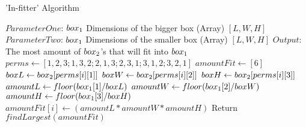 \documentclass{article}
\begin{document}
	
	\begin{algorithm}
		\caption{'In-fitter' Algorithm }
		\label{array-sum}
		\begin{algorithmic}[1]
			\State $ParameterOne$: $box\textsubscript{1}$ Dimensions of the bigger box (Array) $[L, W, H]$
			\State $ParameterTwo$: $box\textsubscript{1}$ Dimensions of the smaller box (Array) $[L, W, H]$
			\State $Output$: The most amount of $box\textsubscript{2}$'s that will fit into $box\textsubscript{1}$
			\State
			\State $perms \leftarrow [1,2,3;1,3,2;2,1,3;2,3,1;3,1,2;3,2,1]$
			\State $amountFit \leftarrow [6] $
			\State $boxL \leftarrow box\textsubscript{2}[perms[i][1]] $ 
			\State $boxW \leftarrow box\textsubscript{2}[perms[i][2]] $
			\State $boxH \leftarrow box\textsubscript{2}[perms[i][3]] $
			\State 
			\State $amountL \leftarrow floor( box\textsubscript{1}[1]/boxL )$
			\State $amountW \leftarrow floor( box\textsubscript{1}[2]/boxW )$
			\State $amountH \leftarrow floor( box\textsubscript{1}[3]/boxH )$
			\State $amountFit[i] \leftarrow (amountL * amountW * amountH)$
			\EndFor
			\State Return $findLargest(amountFit)$
			\EndProcedure
		\end{algorithmic}
	\end{algorithm}
	
	
	
\end{document}
